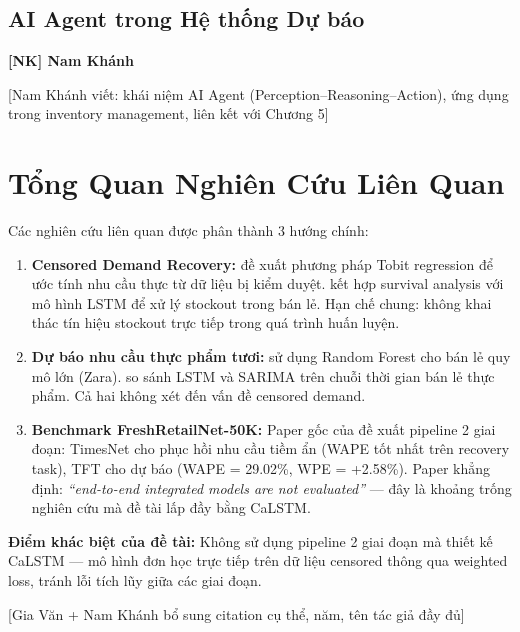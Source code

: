 \documentclass[12pt,a4paper]{report}
\newcommand{\ownerNK}{\colorbox{blue!15}{\textbf{[NK] Nam Khánh}}}
\begin{document}
\subsection{AI Agent trong Hệ thống Dự báo}
\ownerNK

[Nam Khánh viết: khái niệm AI Agent (Perception–Reasoning–Action), ứng dụng trong inventory management, liên kết với Chương 5]

\section{Tổng Quan Nghiên Cứu Liên Quan}

Các nghiên cứu liên quan được phân thành 3 hướng chính:

\begin{enumerate}
    \item \textbf{Censored Demand Recovery:} \citet{narayanan2015} đề xuất phương pháp Tobit regression để ước tính nhu cầu thực từ dữ liệu bị kiểm duyệt. \citet{chen2022} kết hợp survival analysis với mô hình LSTM để xử lý stockout trong bán lẻ. Hạn chế chung: không khai thác tín hiệu stockout trực tiếp trong quá trình huấn luyện.

    \item \textbf{Dự báo nhu cầu thực phẩm tươi:} \citet{ferreira2016} sử dụng Random Forest cho bán lẻ quy mô lớn (Zara). \citet{bandara2020} so sánh LSTM và SARIMA trên chuỗi thời gian bán lẻ thực phẩm. Cả hai không xét đến vấn đề censored demand.

    \item \textbf{Benchmark FreshRetailNet-50K:} Paper gốc của \citet{wang2025frn50k} đề xuất pipeline 2 giai đoạn: TimesNet cho phục hồi nhu cầu tiềm ẩn (WAPE tốt nhất trên recovery task), TFT cho dự báo (WAPE = 29.02\%, WPE = +2.58\%). Paper khẳng định: \textit{``end-to-end integrated models are not evaluated''} --- đây là khoảng trống nghiên cứu mà đề tài lấp đầy bằng CaLSTM.
\end{enumerate}

\textbf{Điểm khác biệt của đề tài:} Không sử dụng pipeline 2 giai đoạn mà thiết kế CaLSTM --- mô hình đơn học trực tiếp trên dữ liệu censored thông qua weighted loss, tránh lỗi tích lũy giữa các giai đoạn.

[Gia Văn + Nam Khánh bổ sung citation cụ thể, năm, tên tác giả đầy đủ]

\newpage

\end{document}
